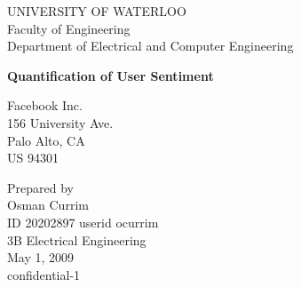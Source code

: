\begin{titlepage}

	\begin{center} \Large
		UNIVERSITY OF WATERLOO\\
		Faculty of Engineering\\
		Department of Electrical and Computer Engineering
	\end{center}
	
	\vspace{1.2in}
	
	\begin{center} \large
		\textbf{Quantification of User Sentiment}
	\end{center}
	
	\vfill
	
	\begin{center}
		Facebook Inc.\\
		156 University Ave.\\
		Palo Alto, CA\\
		US 94301
	\end{center}
	
	\vspace{0.5in}
	
	\begin{center}
		Prepared by\\
		Osman Currim\\
		ID 20202897 \textbar userid ocurrim\\
		3B Electrical Engineering\\
		May 1, 2009\\
		confidential-1
	\end{center}
	
\end{titlepage}